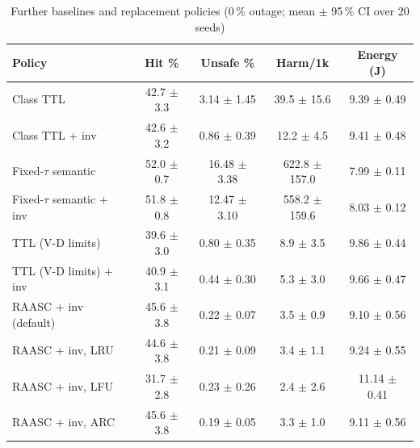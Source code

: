 \documentclass[journal]{IEEEtran}
\newcommand{\pct}{\,\%}
\begin{document}
\begin{table}[!t]
\caption{Further baselines and replacement policies (0\pct{} outage; mean $\pm$ 95\pct{} CI over 20 seeds)}
\label{tab:baselines}
\centering\scriptsize
\setlength{\tabcolsep}{2pt}
\begin{tabular}{lcccc}
\toprule
Policy & Hit \% & Unsafe \% & Harm/1k & Energy (J)\\
\midrule
Class TTL & 42.7 $\pm$ 3.3 & 3.14 $\pm$ 1.45 & 39.5 $\pm$ 15.6 & 9.39 $\pm$ 0.49\\
Class TTL $+$ inv & 42.6 $\pm$ 3.2 & 0.86 $\pm$ 0.39 & 12.2 $\pm$ 4.5 & 9.41 $\pm$ 0.48\\
Fixed-$\tau$ semantic & 52.0 $\pm$ 0.7 & 16.48 $\pm$ 3.38 & 622.8 $\pm$ 157.0 & 7.99 $\pm$ 0.11\\
Fixed-$\tau$ semantic $+$ inv & 51.8 $\pm$ 0.8 & 12.47 $\pm$ 3.10 & 558.2 $\pm$ 159.6 & 8.03 $\pm$ 0.12\\
TTL (V-D limits) & 39.6 $\pm$ 3.0 & 0.80 $\pm$ 0.35 & 8.9 $\pm$ 3.5 & 9.86 $\pm$ 0.44\\
TTL (V-D limits) $+$ inv & 40.9 $\pm$ 3.1 & 0.44 $\pm$ 0.30 & 5.3 $\pm$ 3.0 & 9.66 $\pm$ 0.47\\
RAASC $+$ inv (default) & 45.6 $\pm$ 3.8 & 0.22 $\pm$ 0.07 & 3.5 $\pm$ 0.9 & 9.10 $\pm$ 0.56\\
RAASC $+$ inv, LRU & 44.6 $\pm$ 3.8 & 0.21 $\pm$ 0.09 & 3.4 $\pm$ 1.1 & 9.24 $\pm$ 0.55\\
RAASC $+$ inv, LFU & 31.7 $\pm$ 2.8 & 0.23 $\pm$ 0.26 & 2.4 $\pm$ 2.6 & 11.14 $\pm$ 0.41\\
RAASC $+$ inv, ARC & 45.6 $\pm$ 3.8 & 0.19 $\pm$ 0.05 & 3.3 $\pm$ 1.0 & 9.11 $\pm$ 0.56\\
\bottomrule
\end{tabular}
\end{table}
\end{document}
